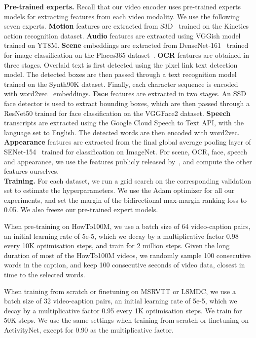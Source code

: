 \documentclass[runningheads]{llncs}
\begin{document}
\noindent\textbf{Pre-trained experts.} Recall that our video encoder uses pre-trained experts models for extracting features from each video modality. We use the following seven experts. \textbf{Motion} features are extracted from S3D~\cite{Xie2017S3D} trained on the Kinetics action recognition dataset. \textbf{Audio} features are extracted using VGGish model~\cite{Hershey2017VGGish} trained on YT8M. \textbf{Scene} embeddings are extracted from DenseNet-161~\cite{Huang2016DenselyCC} trained for image classification on the Places365 dataset~\cite{Zhou2018PlacesA1}. \textbf{OCR} features are obtained in three stages. Overlaid text is first detected using the pixel link text detection model. The detected boxes are then passed through a text recognition model trained on the Synth90K dataset. Finally, each character sequence is encoded with word2vec~\cite{Mikolov2013Word2Vec} embeddings. \textbf{Face} features are extracted in two stages. An SSD face detector is used to extract bounding boxes, which are then passed through a ResNet50 trained for face classification on the VGGFace2 dataset. \textbf{Speech} transcripts are extracted using the Google Cloud Speech to Text API, with the language set to English. The detected words are then encoded with word2vec.
\textbf{Appearance} features are extracted from the final global average pooling layer of SENet-154~\cite{Hu2017SeNet} trained for classification on ImageNet. For scene, OCR, face, speech and appearance, we use the features publicly released by~\cite{liu2019use}, and compute the other features ourselves.\\

\noindent\textbf{Training.}
For each dataset, we run a grid search on the corresponding validation set to estimate the hyperparameters. We use the Adam optimizer for all our experiments, and set the margin of the bidirectional max-margin ranking loss to 0.05. We also freeze our pre-trained expert models.

When pre-training on HowTo100M, we use a batch size of 64 video-caption pairs, an initial learning rate of 5e-5, which we decay by a multiplicative factor 0.98 every 10K optimisation steps, and train for 2 million steps. Given the long duration of most of the HowTo100M videos, we randomly sample 100 consecutive words in the caption, and keep 100 consecutive seconds of video data, closest in time to the selected words.

When training from scratch or finetuning on MSRVTT or LSMDC, we use a batch size of 32 video-caption pairs, an initial learning rate of 5e-5, which we decay by a multiplicative factor 0.95 every 1K optimisation steps. We train for 50K steps. We use the same settings when training from scratch or finetuning on ActivityNet, except for 0.90 as the multiplicative factor. 
\end{document}
